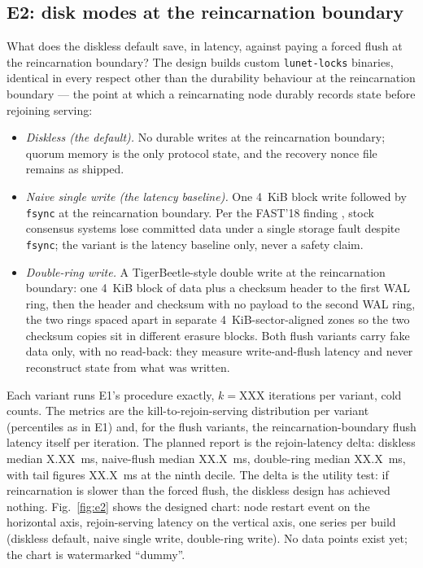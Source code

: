 \documentclass[10pt,journal,letterpaper]{IEEEtran}
\newcommand{\code}[1]{\texttt{#1}}
\begin{document}
\subsection{E2: disk modes at the reincarnation boundary}
What does the diskless default save, in latency, against paying a forced
flush at the reincarnation boundary? The design builds custom \code{lunet-locks}
binaries, identical in every respect other than the durability behaviour at
the reincarnation boundary --- the point at which a reincarnating node durably
records state before rejoining serving:
\begin{itemize}
\item \emph{Diskless (the default).} No durable writes at the reincarnation
boundary; quorum memory is the only protocol state, and the recovery nonce
file remains as shipped.
\item \emph{Naive single write (the latency baseline).} One 4~KiB block
write followed by \code{fsync} at the reincarnation boundary. Per the FAST'18
finding \cite{par}, stock consensus systems lose committed data under a
single storage fault despite \code{fsync}; the variant is the latency baseline
only, never a safety claim.
\item \emph{Double-ring write.} A TigerBeetle-style double write at the
reincarnation boundary: one 4~KiB block of data plus a checksum header to the
first WAL ring, then the header and checksum with no payload to the second
WAL ring, the two rings spaced apart in separate 4~KiB-sector-aligned zones
so the two checksum copies sit in different erasure blocks. Both flush
variants carry fake data only, with no read-back: they measure
write-and-flush latency and never reconstruct state from what was written.
\end{itemize}
Each variant runs E1's procedure exactly, $k=\mathrm{XXX}$ iterations per
variant, cold counts. The metrics are the kill-to-rejoin-serving
distribution per variant (percentiles as in E1) and, for the flush
variants, the reincarnation-boundary flush latency itself per iteration. The
planned report is the rejoin-latency delta: diskless median
X.XX~ms, naive-flush median XX.X~ms, double-ring
median XX.X~ms, with tail figures XX.X~ms at the ninth
decile. The delta is the utility test: if reincarnation is slower than the
forced flush, the diskless design has achieved nothing.
Fig.~\ref{fig:e2} shows the designed chart: node restart event on the
horizontal axis, rejoin-serving latency on the vertical axis, one series per
build (diskless default, naive single write, double-ring write). No data
points exist yet; the chart is watermarked ``dummy''.
\end{document}
